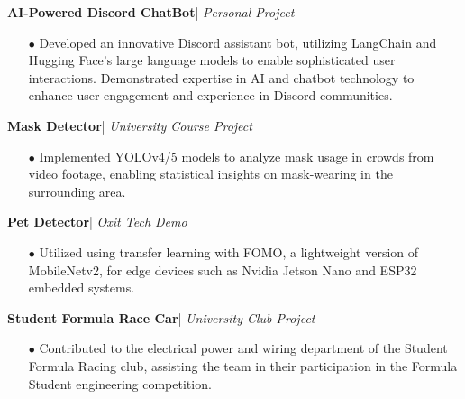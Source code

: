 \documentclass[10pt]{article}
\begin{document}
 \textbf{\large AI-Powered Discord ChatBot}|  
 \hfill \emph{Personal Project}
\\[-0.6cm]
	\begin{itemize}[itemsep = -0.75 mm, leftmargin=*]
        \item[{\color[RGB]{10,0,254}$\bullet$}] \noindent Developed an innovative Discord assistant bot, utilizing LangChain and Hugging Face's large language models to enable sophisticated user interactions. Demonstrated expertise in AI and chatbot technology to enhance user engagement and experience in Discord communities.
	\end{itemize} 	
\textbf{\large Mask Detector}|  
\hfill \emph{University Course Project}
\\[-0.6cm]
	\begin{itemize}[itemsep = -0.75 mm, leftmargin=*]
        \item[{\color[RGB]{10,0,254}$\bullet$}] \noindent Implemented YOLOv4/5 models to analyze mask usage in crowds from video footage, enabling statistical insights on mask-wearing in the surrounding area.
	\end{itemize}
\textbf{\large Pet Detector}|  
\hfill \emph{Oxit Tech Demo}
\\[-0.6cm]
	\begin{itemize}[itemsep = -0.75 mm, leftmargin=*]
        \item[{\color[RGB]{10,0,254}$\bullet$}] \noindent Utilized using transfer learning with FOMO, a lightweight version of MobileNetv2, for edge devices such as Nvidia Jetson Nano and ESP32 embedded systems.
	\end{itemize} 	
  \textbf{\large Student Formula Race Car}|  
 \hfill \emph{University Club Project}
\\[-0.6cm]
	\begin{itemize}[itemsep = -0.75 mm, leftmargin=*]
        \item[{\color[RGB]{10,0,254}$\bullet$}] \noindent Contributed to the electrical power and wiring department of the Student Formula Racing club, assisting the team in their participation in the Formula Student engineering competition.
	\end{itemize} 	
\vspace{-15pt}

\end{document}
